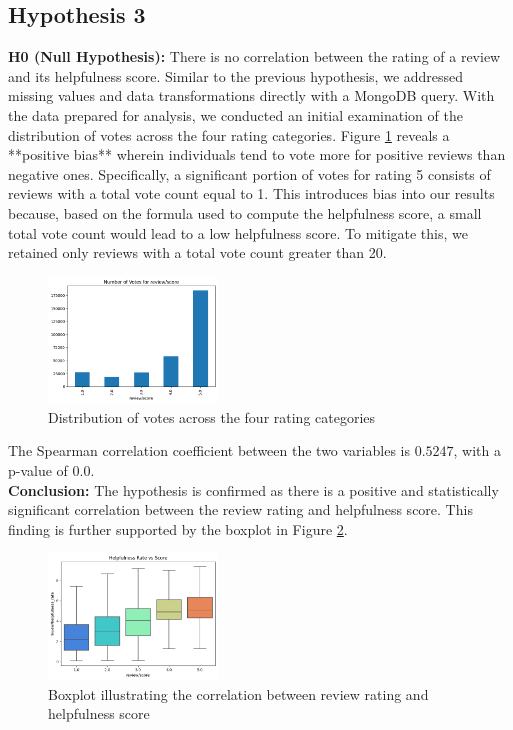 \subsection*{Hypothesis 3}

\textbf{H0 (Null Hypothesis):} There is no correlation between the rating of a review and its helpfulness score.
\noindent
Similar to the previous hypothesis, we addressed missing values and data transformations directly with a MongoDB query.
With the data prepared for analysis, we conducted an initial examination of the distribution of votes across the four rating
categories. Figure \ref{fig:h3_votes_distribution} reveals a **positive bias** wherein individuals tend to vote more for
positive reviews than negative ones. Specifically, a significant portion of votes for rating 5 consists of reviews with a
total vote count equal to 1. This introduces bias into our results because, based on the formula used to compute the
helpfulness score, a small total vote count would lead to a low helpfulness score. To mitigate this, we retained only
reviews with a total vote count greater than 20.

\begin{figure}[H]
    \centering
    \includegraphics[width=0.4\textwidth]{./figures/h3_votes_distribution.png}
    \caption{Distribution of votes across the four rating categories}
    \label{fig:h3_votes_distribution}
\end{figure}

\noindent
The Spearman correlation coefficient between the two variables is $0.5247$, with a p-value of $0.0$.\\
\textbf{Conclusion:}
The hypothesis is confirmed as there is a positive and statistically significant correlation between the review rating
and helpfulness score. This finding is further supported by the boxplot in Figure \ref{fig:h3_boxplot}.

\begin{figure}[H]
    \centering
    \includegraphics[width=0.4\textwidth]{./figures/h3_boxplot.png}
    \caption{Boxplot illustrating the correlation between review rating and helpfulness score}
    \label{fig:h3_boxplot}
\end{figure}
